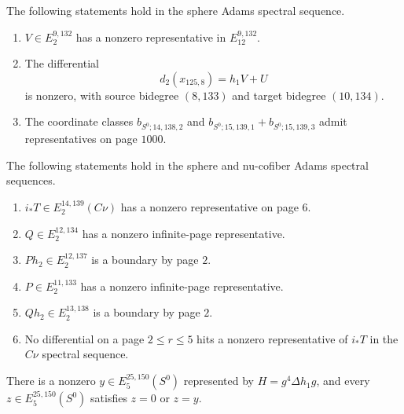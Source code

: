 
\begin{theorem}
\label{frontier:AdamsCalculations:e95db202825f}
The following statements hold in the sphere Adams spectral sequence.
\begin{enumerate}
\item $V\in E_2^{9,132}$ has a nonzero representative in $E_{12}^{9,132}$.
\item The differential
\[d_2(x_{125,8})=h_1V+U\]
is nonzero, with source bidegree $(8,133)$ and target bidegree $(10,134)$.
\item The coordinate classes $b_{S^0;14,138,2}$ and $b_{S^0;15,139,1}+b_{S^0;15,139,3}$ admit representatives on page $1000$.
\end{enumerate}
\end{theorem}

\begin{theorem}
\label{frontier:AdamsCalculations:7621dd387a1a}
The following statements hold in the sphere and nu-cofiber Adams spectral sequences.
\begin{enumerate}
\item $i_*T\in E_2^{14,139}(C\nu)$ has a nonzero representative on page $6$.
\item $Q\in E_2^{12,134}$ has a nonzero infinite-page representative.
\item $Ph_2\in E_2^{12,137}$ is a boundary by page $2$.
\item $P\in E_2^{11,133}$ has a nonzero infinite-page representative.
\item $Qh_2\in E_2^{13,138}$ is a boundary by page $2$.
\item No differential on a page $2\leq r\leq5$ hits a nonzero representative of $i_*T$ in the $C\nu$ spectral sequence.
\end{enumerate}
\end{theorem}

\begin{theorem}
\label{frontier:AdamsCalculations:d30404f96c16}
There is a nonzero $y\in E_5^{25,150}(S^0)$ represented by $H=g^4\Delta h_1g$, and every $z\in E_5^{25,150}(S^0)$ satisfies $z=0$ or $z=y$.
\end{theorem}




